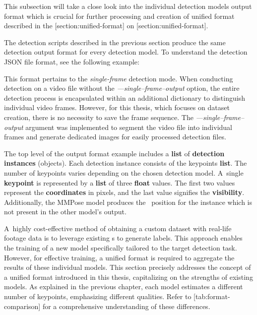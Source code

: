 This subsection will take a close look into the individual detection models output format which is crucial for further processing and creation of unified format described in the [section:unified-format] on [section:unified-format].

The detection scripts described in the previous section produce the same detection output format for every detection model. To understand the detection JSON file format, see the following example:


This format pertains to the {\em single-frame} detection mode. When conducting detection on a video file without the {\em ---single--frame--output} option, the entire detection process is encapsulated within an additional dictionary to distinguish individual video frames. However, for this thesis, which focuses on dataset creation, there is no necessity to save the frame sequence. The {\em---single--frame--output} argument was implemented to segment the video file into individual frames and generate dedicated images for easily processed detection files.

The top level of the output format example includes a {\bf list} of {\bf detection instances} (objects). Each detection instance consists of the keypoints {\bf list}. The number of keypoints varies depending on the chosen detection model. A~single {\bf keypoint} is represented by a {\bf list} of three {\bf float} values. The first two values represent the {\bf coordinates} in pixels, and the last value signifies the {\bf visibility}. Additionally, the MMPose model produces the \BBOX\ position for the instance which is not present in the other model's output.

A~highly cost-effective method of obtaining a custom dataset with real-life footage data is to leverage existing \NN\-s to generate labels. This approach enables the training of a new model specifically tailored to the target detection task. However, for effective training, a unified format is required to aggregate the results of these individual models. This section precisely addresses the concept of a unified format introduced in this thesis, capitalizing on the strengths of existing models. As explained in the previous chapter, each model estimates a different number of keypoints, emphasizing different qualities. Refer to [tab:format-comparison] for a comprehensive understanding of these differences.

